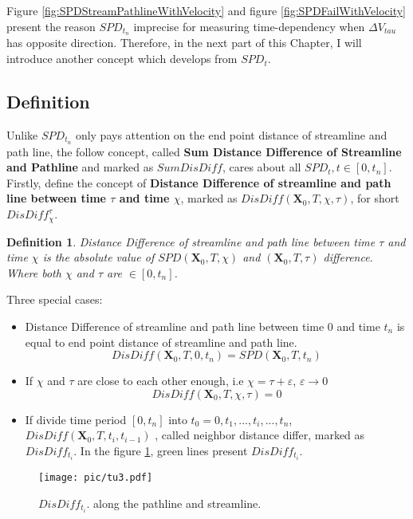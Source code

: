 \documentclass[
     11pt,         %
     a4paper,      %
     oneside,
     ]{article}
\newtheorem{mydef}{Definition}
\newcommand{\vect}[1]{\boldsymbol{#1}}
\begin{document}
Figure \ref{fig:SPDStreamPathlineWithVelocity} and figure \ref{fig:SPDFailWithVelocity} present the reason $SPD_{t_{n}}$ imprecise for measuring time-dependency when $\Delta V_{tau}$ has opposite direction. Therefore, in the next part of this Chapter, I will introduce another concept which develops from $SPD_{t}$.
\subsection{Definition}
Unlike $SPD_{t_{n}}$ only pays attention on the end point distance of streamline and path line, the follow concept, called \textbf{Sum Distance Difference of Streamline and Pathline} and marked as $SumDisDiff$, cares about all $SPD_{t},t\in[0,t_{n}]$.\\
Firstly, define the concept of \textbf{Distance Difference of streamline and path line between time $\tau$ and time $\chi$}, marked as $DisDiff(\vect{X}_{0},T,\chi,\tau)$, for short $DisDiff_{\chi}^{\tau}$. 
\begin{mydef}
	Distance Difference of streamline and path line between time $\tau$ and time $\chi$ is the absolute value of $SPD(\vect{X}_{0},T,\chi)$ and $(\vect{X}_{0},T,\tau)$ difference. Where both $\chi$ and $\tau$ are $\in [0,t_{n}]$.
\end{mydef}

Three special cases:\\
\begin{itemize}
	\item Distance Difference of streamline and path line between time 0 and time $t_{n}$ is equal to end point distance of streamline and path line.
	$$DisDiff(\vect{X}_{0},T,0,t_{n})=SPD(\vect{X}_{0},T,t_{n})$$
	\item If $\chi$ and $\tau$ are close to each other enough, i.e $\chi=\tau+ \varepsilon$, $\varepsilon\rightarrow 0$\\
	$$DisDiff(\vect{X}_{0},T,\chi,\tau)=0$$
	\item If divide time period $[0,t_{n}]$ into $t_{0}=0, t_{1},...,t_{i},...,t_{n}$, $DisDiff(\vect{X}_{0},T,t_{i},t_{i-1})$ , called neighbor distance differ, marked as $DisDiff_{t_{i}}$. In the figure \ref{fig:DisDiff}, green lines present $DisDiff_{t_{i}}$.\\
\end{itemize}

\begin{figure}[H]
	\centering
	\texttt{[image: pic/tu3.pdf]}
	\caption{{\tiny $DisDiff_{t_{i}}$. along the pathline and streamline.}}
	\label{fig:DisDiff}
\end{figure}
\end{document}
